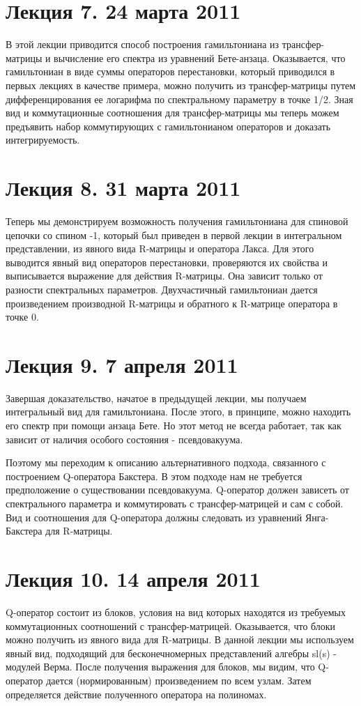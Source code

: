 \documentclass[a4paper,12pt]{article}
\theoremstyle{definition} \newtheorem{Def}{Definition}
\theoremstyle{definition}
\begin{document}
\section{Лекция 7. 24 марта 2011}

В этой лекции приводится способ построения гамильтониана из трансфер-матрицы и вычисление его спектра из уравнений Бете-анзаца. Оказывается, что гамильтониан в виде суммы операторов перестановки, который приводился в первых лекциях в качестве примера, можно получить из трансфер-матрицы путем дифференцирования ее логарифма по спектральному параметру в точке 1/2. Зная вид и коммутационные соотношения для трансфер-матрицы мы теперь можем предъявить набор коммутирующих с гамильтонианом операторов и доказать интегрируемость. 

\section{Лекция 8. 31 марта 2011}

Теперь мы демонстрируем возможность получения гамильтониана для спиновой цепочки со спином -1, который был приведен в первой лекции в интегральном представлении, из явного вида R-матрицы и оператора Лакса. Для этого выводится явный вид операторов перестановки, проверяются их свойства и выписывается выражение для действия R-матрицы. Она зависит только от разности спектральных параметров. Двухчастичный гамильтониан дается произведением производной R-матрицы и обратного к R-матрице оператора в точке 0. 
\section{Лекция 9. 7 апреля 2011}

Завершая доказательство, начатое в предыдущей лекции, мы получаем интегральный вид для гамильтониана. После этого, в принципе, можно находить его спектр при помощи анзаца Бете. Но этот метод не всегда работает, так как зависит от наличия особого состояния - псевдовакуума. 

Поэтому мы переходим к описанию альтернативного подхода, связанного с построением Q-оператора Бакстера. В этом подходе нам не требуется предположение о существовании псевдовакуума. Q-оператор должен зависеть от спектрального параметра и коммутировать с трансфер-матрицей и сам с собой. Вид и соотношения для Q-оператора должны следовать из уравнений Янга-Бакстера для R-матрицы. 
\section{Лекция 10. 14 апреля 2011}
Q-оператор состоит из блоков, условия на вид которых находятся из требуемых коммутационных соотношений с трансфер-матрицей. Оказывается, что блоки можно получить из явного вида для R-матрицы. В данной лекции мы используем явный вид, подходящий для бесконечномерных представлений алгебры sl(s) - модулей Верма. После получения выражения для блоков, мы видим, что Q-оператор дается (нормированным) произведением по всем узлам. Затем определяется действие полученного оператора на полиномах. 
\end{document}

